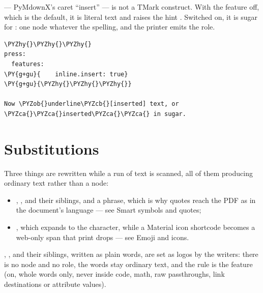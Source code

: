 \documentclass[a4paper,twoside]{article}
\begin{document}
 --- PyMdownX's caret \enquote{insert} --- is not a TMark construct. With the
feature  off, which is the default, it is literal text and
raises the hint . Switched on, it is sugar for :
one node whatever the spelling, and the printer emits the role.
\begin{tscode}[lang=md, engine=pygments]
\begin{Verbatim}[commandchars=\\\{\},breaklines, breakanywhere, commandchars=\\\{\}]
\PYZhy{}\PYZhy{}\PYZhy{}
press:
  features:
\PY{g+gu}{    inline.insert: true}
\PY{g+gu}{\PYZhy{}\PYZhy{}\PYZhy{}}

Now \PYZob{}underline\PYZcb{}[inserted] text, or \PYZca{}\PYZca{}inserted\PYZca{}\PYZca{} in sugar.
\end{Verbatim}
\end{tscode}
\section{Substitutions}
Three things are rewritten while a run of text is scanned, all of them
producing ordinary text rather than a node:
\begin{itemize}
\item {}, \tscodeinline{-\allowbreak{}-\allowbreak{}>},  and their siblings, and a  phrase,
which is why quotes reach the PDF as  in the document's
language --- see Smart symbols and quotes;
\item {}, which expands to the character, while a Material icon shortcode
becomes a web-only span that print drops --- see
Emoji and icons.
\end{itemize}
, ,  and their siblings, written as plain words, are
set as logos by the writers: there is no node and no role, the words stay
ordinary text, and the rule is the feature  (on, whole
words only, never inside code, math, raw passthroughs, link destinations or
attribute values).
\end{document}
